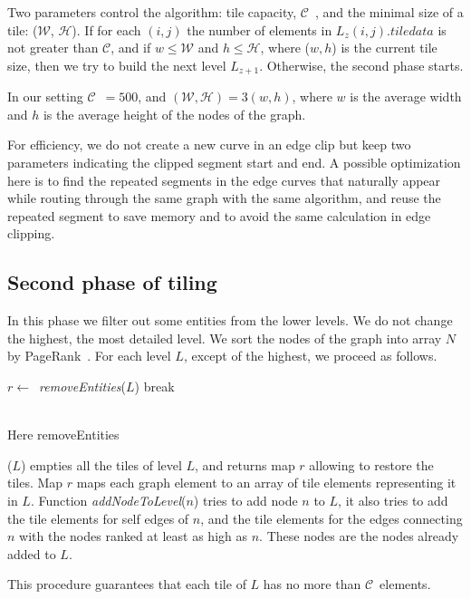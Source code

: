 \documentclass{gd-llncs}
\newcommand{\capac}{$\mathcal{C}$}
\newcommand{\mw}{$\mathcal{W}$}
\newcommand{\mh}{$\mathcal{H}$}
\begin{document}
{Two parameters control the algorithm: tile capacity, \capac~, and the minimal size of a tile: (\mw, \mh).
If for each $(i,j)$ the number of elements in $L_z(i,j).\textit{tiledata}$ is not greater than \capac, and if $w \leq \mathcal{W}$ and $h \leq \mathcal{H}$, where ($w,h$) is the current tile size, then we try to build the next level  $L_{z+1}$. Otherwise, the second phase starts.

In our setting \capac~$=500$, and $(\mathcal{W},\mathcal{H}) = 3(w,h)$, where $w$ is the average width and $h$ is the average height of the nodes of the graph.

For efficiency, we do not create a new curve in an edge clip but keep two parameters indicating the clipped segment start and end.
A possible optimization here is to find the repeated segments in the edge curves that naturally appear
while routing through the same graph with the same algorithm, and reuse the repeated segment to save memory and to avoid the same calculation in edge clipping.

\subsection{Second phase of tiling}
In this phase we filter out some entities from the lower levels. We do not change the highest, the most detailed level.
We sort the nodes of the graph into array $N$ by PageRank~\cite{page1999pagerank}. For each level $L$, except of the highest, we proceed as follows.
\begin{algorithm}
  \begin{algorithmic}[1]
    \State $r \gets$~\textit{removeEntities}($L$)
    {break}
    \EndIf
    \EndFor
    \EndProcedure
  \end{algorithmic}
\end{algorithm}\\
Here removeEntities}($L$) empties all the tiles of level $L$, and returns map $r$ allowing to restore the tiles.
Map $r$ maps each graph element to an array of tile elements representing it in $L$. Function \textit{addNodeToLevel}($n$) tries to add node $n$ to $L$, it also tries to add the tile elements for self edges of $n$, and the tile elements for the edges connecting $n$ with the nodes ranked at least as high as $n$. These nodes are the nodes already added to $L$.

This procedure guarantees that each tile of $L$ has no more than \capac~elements.
\end{document}
